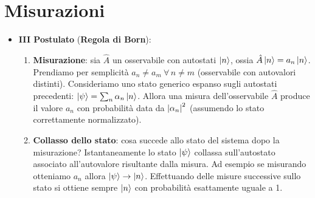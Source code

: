 \section{Misurazioni}

\begin{itemize}
    \item \textbf{III Postulato} (\textbf{Regola di Born}):
    \begin{enumerate}
        \item \textbf{Misurazione}: sia $\hat{A}$ un osservabile con autostati $\ket{n}$, ossia $\hat{A} \ket{n} = a_n \ket{n}$. Prendiamo per semplicità $a_n \neq a_m \ \forall \, n \neq m$ (osservabile con autovalori distinti). Consideriamo uno stato generico espanso sugli autostati precedenti: $\ket \psi = \sum_n \alpha_n \ket n$. Allora una misura dell'osservabile $\hat{A}$ produce il valore $a_n$ con probabilità data da $\abs{\alpha_n}^2$ (assumendo lo stato correttamente normalizzato).
        
        \item \textbf{Collasso dello stato}: cosa succede allo stato del sistema dopo la misurazione? Istantaneamente lo stato $\ket \psi$ collassa sull'autostato associato all'autovalore risultante dalla misura. Ad esempio se misurando otteniamo $a_n$ allora $\ket{\psi} \rightarrow \ket{n}$. Effettuando delle misure successive sullo stato si ottiene sempre $\ket{n}$ con probabilità esattamente uguale a 1.  
    \end{enumerate}
\end{itemize}

